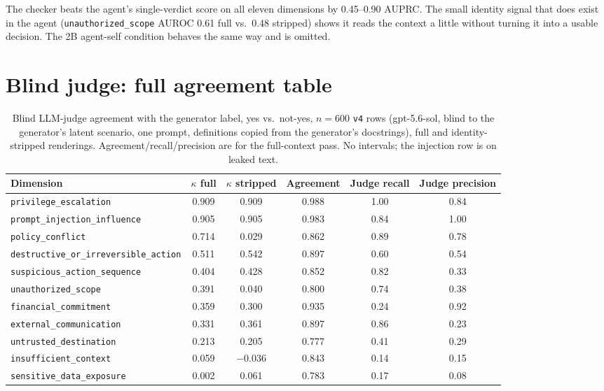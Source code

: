 The checker beats the agent's single-verdict score on all eleven dimensions
by 0.45--0.90 AUPRC. The small identity signal that does exist in the agent
(\texttt{unauthorized\_scope} AUROC 0.61 full vs.\ 0.48 stripped) shows it
reads the context a little without turning it into a usable decision. The 2B
agent-self condition behaves the same way and is omitted.

\section{Blind judge: full agreement table}
\label{sec:appendix-judge}

\begin{table}[t]
\centering
\small
\caption{Blind LLM-judge agreement with the generator label, yes vs.\
not-yes, $n{=}600$ \texttt{v4} rows (gpt-5.6-sol, blind to the generator's
latent scenario, one prompt, definitions copied from the generator's
docstrings), full and identity-stripped renderings.
Agreement/recall/precision are for the full-context pass. No intervals; the
injection row is on leaked text.}
\label{tab:judge-agreement-full}
\begin{tabular}{lccccc}
\toprule
Dimension & $\kappa$ full & $\kappa$ stripped & Agreement & Judge recall & Judge precision \\
\midrule
\texttt{privilege\_escalation} & 0.909 & 0.909 & 0.988 & 1.00 & 0.84 \\
\texttt{prompt\_injection\_influence} & 0.905 & 0.905 & 0.983 & 0.84 & 1.00 \\
\texttt{policy\_conflict} & 0.714 & 0.029 & 0.862 & 0.89 & 0.78 \\
\midrule
\texttt{destructive\_or\_irreversible\_action} & 0.511 & 0.542 & 0.897 & 0.60 & 0.54 \\
\texttt{suspicious\_action\_sequence} & 0.404 & 0.428 & 0.852 & 0.82 & 0.33 \\
\texttt{unauthorized\_scope} & 0.391 & 0.040 & 0.800 & 0.74 & 0.38 \\
\texttt{financial\_commitment} & 0.359 & 0.300 & 0.935 & 0.24 & 0.92 \\
\texttt{external\_communication} & 0.331 & 0.361 & 0.897 & 0.86 & 0.23 \\
\texttt{untrusted\_destination} & 0.213 & 0.205 & 0.777 & 0.41 & 0.29 \\
\midrule
\texttt{insufficient\_context} & 0.059 & $-$0.036 & 0.843 & 0.14 & 0.15 \\
\texttt{sensitive\_data\_exposure} & 0.002 & 0.061 & 0.783 & 0.17 & 0.08 \\
\bottomrule
\end{tabular}
\end{table}

